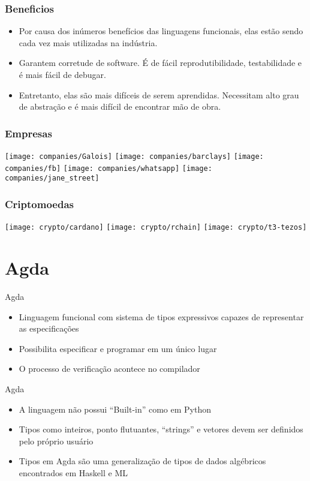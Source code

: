 \documentclass{beamer}
\begin{document}
\begin{frame}
  \frametitle{Beneficios}
  \begin{itemize}
    \item Por causa dos inúmeros benefícios das linguagens funcionais,
      elas estão sendo cada vez mais utilizadas na indústria.
    \item Garantem corretude de software.
      É de fácil reprodutibilidade, testabilidade e é mais fácil de debugar.
    \item Entretanto, elas são mais difíceis de serem aprendidas.
      Necessitam alto grau de abstração e
      é mais difícil de encontrar mão de obra.
  \end{itemize}
\end{frame}

\begin{frame}
  \frametitle{Empresas}
    \texttt{[image: companies/Galois]}
    \texttt{[image: companies/barclays]}
    \texttt{[image: companies/fb]}
    \texttt{[image: companies/whatsapp]}
    \texttt{[image: companies/jane\_street]}
\end{frame}

\begin{frame}
  \frametitle{Criptomoedas}
    \texttt{[image: crypto/cardano]}
    \texttt{[image: crypto/rchain]}
    \texttt{[image: crypto/t3-tezos]}
\end{frame}
 
\section{Agda}

 \begin{frame}{Agda}
 \begin{itemize}
   \item Linguagem funcional com sistema de tipos expressivos capazes de representar as especificações
     \item Possibilita especificar e programar em um único lugar
     \item O processo de verificação acontece no compilador
 \end{itemize}
 \end{frame}
 
 \begin{frame}{Agda}
 \begin{itemize}
     \item A linguagem não possui \foreignquote{english}{Built-in} como em Python
     \item Tipos como inteiros, ponto flutuantes, \foreignquote{english}{strings} e vetores devem ser definidos pelo próprio usuário
     \item Tipos em Agda são uma generalização de tipos de dados algébricos encontrados em Haskell e ML
 \end{itemize}
 \end{frame}
\end{document}
